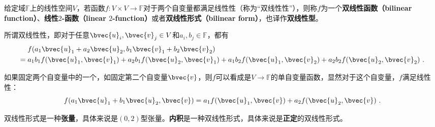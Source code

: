 


给定域$\mathbb{F}$上的线性空间$V$，若函数$f:V\times V\to \mathbb{F}$对于两个自变量都满足线性性（称为“双线性性”），则称$f$为一个\textbf{双线性函数（bilinear function）}、\textbf{线性$2$-函数（linear $2$-function）}或者\textbf{双线性形式（bilinear form）}，也译作\textbf{双线性型}。


所谓双线性性，即对于任意$\bvec{u}_i, \bvec{v}_j\in V$和$a_i, b_j\in\mathbb{F}$，都有
\begin{equation}
\begin{aligned}
&f(a_1\bvec{u}_1+a_2\bvec{u}_2, b_1\bvec{v}_1+b_2\bvec{v}_2)\\
={}& a_1b_1f(\bvec{u}_1, \bvec{v}_1)+a_2b_1f(\bvec{u}_2, \bvec{v}_1)+a_1b_2f(\bvec{u}_1, \bvec{v}_2)+a_2b_2f(\bvec{u}_2, \bvec{v}_2)~. 
\end{aligned}
\end{equation}

如果固定两个自变量中的一个，如固定第二个自变量$\bvec{v}$，则$f$可以看成是$V\to \mathbb{F}$的单自变量函数，显然对于这个自变量，$f$满足线性性：
\begin{equation}
f(a_1\bvec{u}_1+b_1\bvec{u}_2, \bvec{v})=a_1f(\bvec{u}_1, \bvec{v})+a_2f(\bvec{u}_2, \bvec{v})~. 
\end{equation}






双线性形式是一种\textbf{张量}，具体来说是$(0, 2)$型张量。\textbf{内积}是一种双线性形式，具体来说是\textbf{正定}的双线性形式。


















